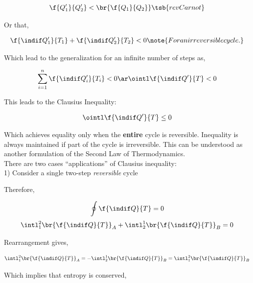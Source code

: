 \documentclass{article}
\begin{document}
\[ \f{Q'_1}{Q'_2} < \br{\f{Q_1}{Q_2}}\tsb{rev Carnot} \]

Or that,

\[ \f{\indif Q'_1}{T_1} + \f{\indif Q'_2}{T_2} < 0 \note{For an irreversible cycle.} \]

Which lead to the generalization for an infinite number of steps as,

\[ \sum_{i=1}^{n} \f{\indif Q'_i}{T_i} < 0 \ar \ointl \f{\indif Q'}{T} < 0  \]

This leads to the Clausius Inequality:

\[ \ointl \f{\indif Q'}{T} \leq 0 \]

Which achieves equality only when the \textbf{entire} cycle is reversible. Inequality is always maintained if  part of the cycle is irreversible. This can be understood as another formulation of the Second Law of Thermodynamics. \\

There are two cases ``applications'' of Clausius inequality: \\

1) Consider a single two-step \textit{reversible} cycle

\begin{center}
\end{center}

Therefore,

\[ \oint \f{\indif Q}{T} = 0 \]
\[ \intl_1^2 \br{\f{\indif Q}{T}}_A + \intl_2^1 \br{\f{\indif Q}{T}}_B = 0 \]

Rearrangement gives,

\[ \intl_1^2 \br{\f{\indif Q}{T}}_A = - \intl_2^1 \br{\f{\indif Q}{T}}_B = \intl_1^2 \br{\f{\indif Q}{T}}_B\]

Which implies that entropy is conserved,
\end{document}
